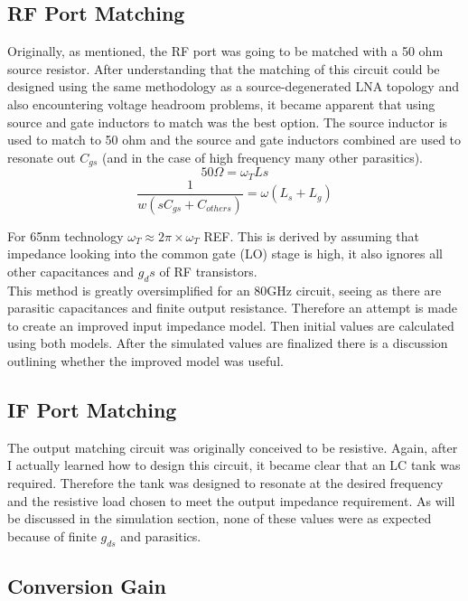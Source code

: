 \documentclass{article}                                                         %
\begin{document}
\subsection{RF Port Matching}
Originally, as mentioned, the RF port was going to be matched with a 50 ohm source resistor. After understanding that the
matching of this circuit could be designed using the same methodology as a source-degenerated LNA topology and also encountering
voltage headroom problems, it became apparent that using source and gate inductors to match was the best option. The source inductor is used to match to 50 ohm
and the source and gate inductors combined are used to resonate out $C_{gs}$ (and in the case of high frequency many other parasitics).
\begin{equation}
  \label{eq:InputRes}
  50 \Omega = \omega_TLs
\end{equation}
\begin{equation}
  \label{eq:GateInd}
  \dfrac{1}{w(sC_{gs}+C_{others})} = \omega(L_s+L_g)
\end{equation}

For 65nm technology $\omega_T \approx 2\pi \times \omega_T$ REF. This is derived by assuming that impedance looking into the common gate (LO) stage is high,
it also ignores all other capacitances and $g_ds$ of RF transistors. \\

This method is greatly oversimplified for an 80GHz circuit, seeing as there are parasitic capacitances and finite output resistance. Therefore an attempt is made to create an improved input impedance model. Then initial values
are calculated using both models. After the simulated values are finalized there is a discussion outlining whether the improved model was useful.

\subsection{IF Port Matching}
 The output matching circuit was originally conceived to be resistive. Again, after I actually learned how to design this circuit,
 it became clear that an LC tank was required. Therefore the tank was designed to resonate at the desired frequency and the resistive
 load chosen to meet the output impedance requirement. As will be discussed in the simulation section, none of these values were as expected
 because of finite $g_{ds}$ and parasitics.

\subsection{Conversion Gain}
\end{document}
